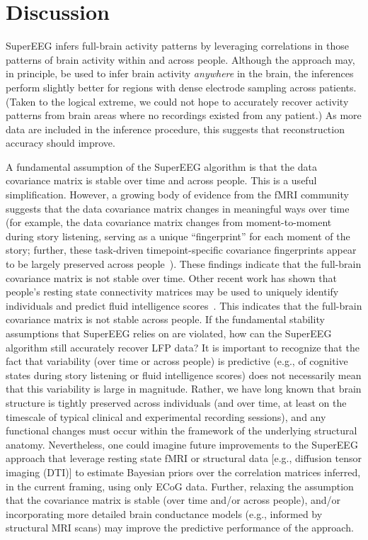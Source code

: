 \documentclass[11pt]{article}
\begin{document}
\section*{Discussion}
SuperEEG infers full-brain activity patterns by leveraging
correlations in those patterns of brain activity within and across people.  Although
the approach may, in principle, be used to infer brain activity
\textit{anywhere} in the brain, the inferences perform slightly better for
regions with dense electrode sampling across patients.  (Taken to the logical extreme, we could not hope to accurately recover activity patterns from brain areas where no recordings existed from any patient.)   As more data
are included in the inference procedure, this suggests that reconstruction accuracy should improve.

A fundamental assumption of the SuperEEG algorithm is that the data
covariance matrix is stable over time and across people.  This is a
useful simplification.  However, a growing body of evidence from the
fMRI community suggests that the data covariance matrix changes in
meaningful ways over time (for example, the data covariance matrix
changes from moment-to-moment during story listening, serving as a
unique ``fingerprint'' for each moment of the story; further, these
task-driven timepoint-specific covariance fingerprints appear to be
largely preserved across people~\cite{SimoEtal16, MannEtal17}).  These
findings indicate that the full-brain covariance matrix is not stable
over time.  Other recent work has shown that people's resting state
connectivity matrices may be used to uniquely identify individuals and
predict fluid intelligence scores~\cite{FinnEtal15}.  This indicates
that the full-brain covariance matrix is not stable across people.  If
the fundamental stability assumptions that SuperEEG relies on are
violated, how can the SuperEEG algorithm still accurately recover LFP
data?  It is important to recognize that the fact that variability
(over time or across people) is predictive (e.g., of cognitive states
during story listening or fluid intelligence scores) does not
necessarily mean that this variability is large in magnitude.  Rather,
we have long known that brain structure is tightly preserved across
individuals (and over time, at least on the timescale of typical
clinical and experimental recording sessions), and any functional
changes must occur within the framework of the underlying structural
anatomy.  Nevertheless, one could imagine future improvements to the
SuperEEG approach that leverage resting state fMRI or structural data
[e.g., diffusion tensor imaging (DTI)] to estimate Bayesian priors over
the correlation matrices inferred, in the current framing, using only
ECoG data.  Further, relaxing the assumption that the covariance
matrix is stable (over time and/or across people), and/or
incorporating more detailed brain conductance models (e.g., informed
by structural MRI scans) may improve the predictive performance of the
approach.
\end{document}
